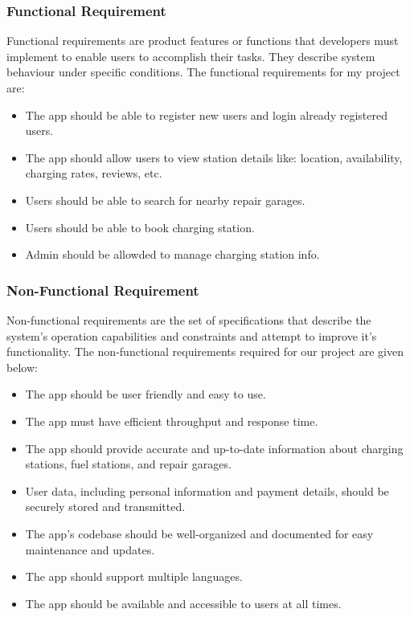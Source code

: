 \subsubsection{Functional Requirement}
Functional requirements are product features or functions that developers must implement to enable users to accomplish their tasks. They describe system behaviour under specific conditions. The functional requirements for my project are:
\begin{itemize}
    \item The app should be able to register new users and login already registered users.
    \item The app should allow users to view station details like: location, availability, charging rates, reviews, etc.
    \item Users should be able to search for nearby repair garages.
    \item Users should be able to book charging station.
    \item Admin should be allowded to manage charging station info.
\end{itemize}
\subsubsection{Non-Functional Requirement}
Non-functional requirements  are the set of specifications that describe the system's operation capabilities and constraints and attempt to improve it's functionality. The non-functional requirements required for our project are given below:
\begin{itemize}
    \item The app should be user friendly and easy to use.
    \item The app must have efficient throughput and response time.
    \item The app should provide accurate and up-to-date information about charging stations, fuel stations, and repair garages.
    \item User data, including personal information and payment details, should be securely stored and transmitted.
    \item The app's codebase should be well-organized and documented for easy maintenance and updates.
    \item The app should support multiple languages.
    \item The app should be available and accessible to users at all times.
\end{itemize}